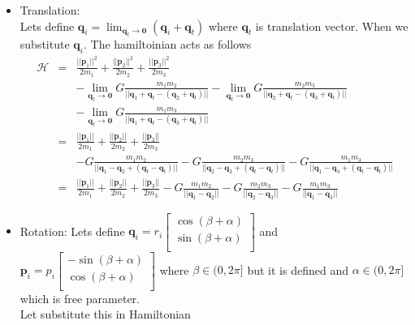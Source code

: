 \begin{itemize}
	\item Translation:\\
	Lets define $\mathbf{q}_i = \lim_{\mathbf{q}_t\rightarrow \mathbf{0}}(\mathbf{q}_i + \mathbf{q}_t)$ where $\mathbf{q}_t$ is translation vector. When we substitute $\mathbf{q}_i$. The hamiltoinian acts as follows
	\begin{eqnarray*}
		\mathcal{H} &=& \frac{||\mathbf{p}_1||^2}{2m_1} +\frac{||\mathbf{p}_2||^2}{2m_2}+\frac{||\mathbf{p}_3||^2 }{2m_3}\\
		& & - \lim_{\mathbf{q}_t\rightarrow \mathbf{0}}G\frac{m_1m_2}{||\mathbf{q}_1+ \mathbf{q}_t  - (\mathbf{q}_2+ \mathbf{q}_t) ||}-\lim_{\mathbf{q}_t\rightarrow \mathbf{0}}G\frac{m_2m_3}{||\mathbf{q}_2 + \mathbf{q}_t - (\mathbf{q}_3+ \mathbf{q}_t) ||}\\
		& &-\lim_{\mathbf{q}_t\rightarrow \mathbf{0}}G\frac{m_1m_3}{||\mathbf{q}_1+ \mathbf{q}_t  - (\mathbf{q}_3+ \mathbf{q}_t) ||}\\
		&=& \frac{||\mathbf{p}_1||}{2m_1} +\frac{||\mathbf{p}_2||}{2m_2}+\frac{||\mathbf{p}_3||}{2m_3}\\ & &-  G\frac{m_1m_2}{||\mathbf{q}_1 - \mathbf{q}_2 +(\mathbf{q}_t-\mathbf{q}_t) ||}-G\frac{m_2m_3}{||\mathbf{q}_2 - \mathbf{q}_3 +(\mathbf{q}_t-\mathbf{q}_t)||}-G\frac{m_1m_3}{||\mathbf{q}_1 - \mathbf{q}_3+(\mathbf{q}_t-\mathbf{q}_t)||}\\
		& = & \frac{||\mathbf{p}_1||}{2m_1} +\frac{||\mathbf{p}_2||}{2m_2}+\frac{||\mathbf{p}_3||}{2m_3} - G\frac{m_1m_2}{||\mathbf{q}_1 - \mathbf{q}_2||}-G\frac{m_2m_3}{||\mathbf{q}_2 - \mathbf{q}_3||}-G\frac{m_1m_3}{||\mathbf{q}_1 - \mathbf{q}_3||} 
	\end{eqnarray*}
	\item Rotation:
	Lets define $\mathbf{q}_i = r_i \begin{bmatrix}
		\cos(\beta + \alpha)\\
		\sin(\beta + \alpha)\\
		\end{bmatrix}$ and $\mathbf{p}_i = p_i \begin{bmatrix}
		-\sin(\beta + \alpha)\\
		\cos(\beta + \alpha)\\
		\end{bmatrix}$ where $\beta \in (0,2\pi]$ but it is defined and $\alpha \in (0,2\pi] $  which is free parameter.\\
	Let substitute this in Hamiltonian
	\begin{eqnarray*}

\end{eqnarray*}
\end{itemize}
